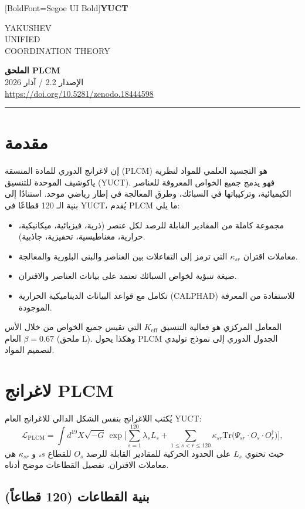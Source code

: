 \documentclass[11pt,a4paper]{article}
\newcommand{\Keff}{K_{\mathrm{eff}}}
\newcommand{\be}{\beta}
\newcommand{\makeheader}{%
	\noindent
	\begin{minipage}{0.17\textwidth}
		\raggedright
		{\fontspec{Segoe UI}[BoldFont=Segoe UI Bold]\bfseries\color{skyblue}\fontsize{46}{46}\selectfont YUCT}%
	\end{minipage}%
	\hspace{30pt}
	\begin{minipage}{0.32\textwidth}
		\raggedright
		{\sffamily\fontsize{11}{13}\selectfont YAKUSHEV\\ UNIFIED\\ COORDINATION THEORY}%
	\end{minipage}%
	\hfill
	\begin{minipage}{0.38\textwidth}
		\raggedleft
		{\sffamily\bfseries الملحق PLCM}\\ 
		{\sffamily الإصدار 2.2 / آذار 2026}\\ 
		{\sffamily\footnotesize \url{https://doi.org/10.5281/zenodo.18444598}}%
	\end{minipage}
	\par\vspace{5pt}
	\noindent\textcolor{gold}{\rule{\textwidth}{1.6pt}}
	\par\vspace{0pt}
}
\begin{document}
	\makeheader
	\thispagestyle{firstpage}
	\vspace{15pt}
	
	\begin{otherlanguage}{arabic}
		
		\tableofcontents
		\newpage
		
		\section{مقدمة}
		
		إن لاغرانج الدوري للمادة المنسقة (PLCM) هو التجسيد العلمي للمواد لنظرية ياكوشيف الموحدة للتنسيق (YUCT). فهو يدمج جميع الخواص المعروفة للعناصر الكيميائية، وتركيباتها في السبائك، وطرق المعالجة في إطار رياضي موحد. استنادًا إلى بنية الـ 120 قطاعًا في YUCT، يُقدم PLCM ما يلي:
		\begin{itemize}
			\item مجموعة كاملة من المقادير القابلة للرصد لكل عنصر (ذرية، فيزيائية، ميكانيكية، حرارية، مغناطيسية، تحفيزية، جاذبية).
			\item معاملات اقتران \(\kappa_{sr}\) التي ترمز إلى التفاعلات بين العناصر والبنى البلورية والمعالجة.
			\item صيغة تنبؤية لخواص السبائك تعتمد على بيانات العناصر والاقتران.
			\item تكامل مع قواعد البيانات الديناميكية الحرارية (CALPHAD) للاستفادة من المعرفة الموجودة.
		\end{itemize}
		المعامل المركزي هو فعالية التنسيق \(\Keff\) التي تقيس جميع الخواص من خلال الأس العام \(\be = 0.67\) (ملحق L). وهكذا يحول PLCM الجدول الدوري إلى نموذج توليدي لتصميم المواد.
		
		\section{لاغرانج PLCM}
		
		يُكتب اللاغرانج بنفس الشكل الدالي للاغرانج العام YUCT:
		\[
		\mathcal{L}_{\text{PLCM}} = \int d^{19}X \sqrt{-G} \,
		\exp\Bigg[ \sum_{s=1}^{120} \lambda_s L_s + \sum_{1\le s<r\le 120} \kappa_{sr} \mathrm{Tr}\big(\Psi_{sr} \cdot O_s \cdot O_r^\dagger\big) \Bigg],
		\]
		حيث تحتوي \(L_s\) على الحدود الحركية للمقادير القابلة للرصد \(O_s\) للقطاع \(s\)، و \(\kappa_{sr}\) هي معاملات الاقتران. تفصيل القطاعات موضح أدناه.
		
		\subsection{بنية القطاعات (120 قطاعاً)}
		

\end{otherlanguage}
\end{document}
